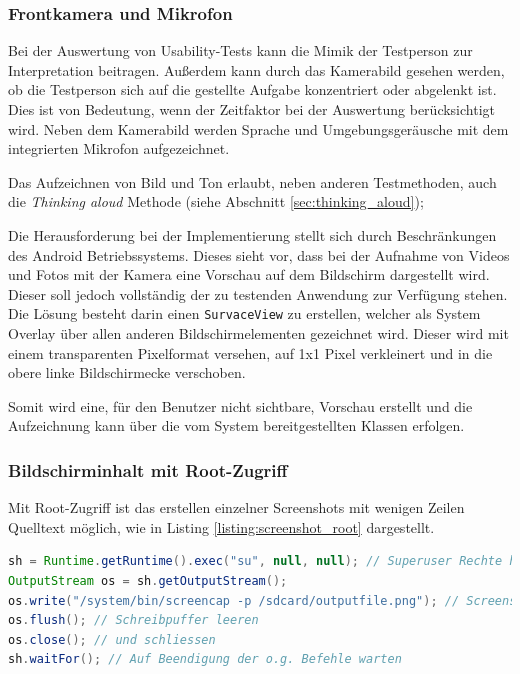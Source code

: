 \subsubsection{Frontkamera und Mikrofon}
Bei der Auswertung von Usability-Tests kann die Mimik der Testperson zur Interpretation beitragen.
Außerdem kann durch das Kamerabild gesehen werden, ob die Testperson sich auf die gestellte Aufgabe konzentriert oder abgelenkt ist.
Dies ist von Bedeutung, wenn der Zeitfaktor bei der Auswertung berücksichtigt wird.
Neben dem Kamerabild werden Sprache und Umgebungsgeräusche mit dem integrierten Mikrofon aufgezeichnet.

Das Aufzeichnen von Bild und Ton erlaubt, neben anderen Testmethoden, auch die \emph{Thinking aloud} Methode (siehe Abschnitt \ref{sec:thinking_aloud});

Die Herausforderung bei der Implementierung stellt sich durch Beschränkungen des Android Betriebssystems.
Dieses sieht vor, dass bei der Aufnahme von Videos und Fotos mit der Kamera eine Vorschau auf dem Bildschirm dargestellt wird.
Dieser soll jedoch vollständig der zu testenden Anwendung zur Verfügung stehen.
Die Lösung besteht darin einen \texttt{SurvaceView} zu erstellen, welcher als System Overlay über allen anderen Bildschirmelementen gezeichnet wird. 
Dieser wird mit einem transparenten Pixelformat versehen, auf 1x1 Pixel verkleinert und in die obere linke Bildschirmecke verschoben.

Somit wird eine, für den Benutzer nicht sichtbare, Vorschau erstellt und die Aufzeichnung kann über die vom System bereitgestellten Klassen erfolgen.


\subsubsection{Bildschirminhalt mit Root-Zugriff}
Mit Root-Zugriff ist das erstellen einzelner Screenshots mit wenigen Zeilen Quelltext möglich, wie in Listing \ref{listing:screenshot_root} dargestellt.

\begin{lstlisting}[label=listing:screenshot_root,language=Java, caption=Screenshot Aufnahme mit Root-Zugriff]
sh = Runtime.getRuntime().exec("su", null, null); // Superuser Rechte holen
OutputStream os = sh.getOutputStream();
os.write("/system/bin/screencap -p /sdcard/outputfile.png"); // Screenshot erstellen
os.flush(); // Schreibpuffer leeren 
os.close(); // und schliessen
sh.waitFor(); // Auf Beendigung der o.g. Befehle warten
\end{lstlisting}

